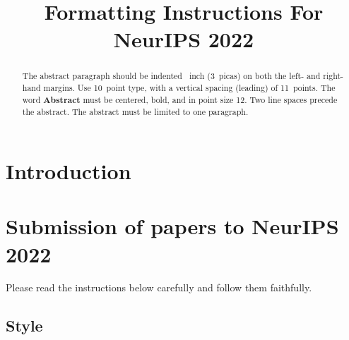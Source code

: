 \documentclass{article}
\title{Formatting Instructions For NeurIPS 2022}
\begin{document}
\maketitle


\begin{abstract}
  The abstract paragraph should be indented ~inch (3~picas) on
  both the left- and right-hand margins. Use 10~point type, with a vertical
  spacing (leading) of 11~points.  The word \textbf{Abstract} must be centered,
  bold, and in point size 12. Two line spaces precede the abstract. The abstract
  must be limited to one paragraph.
\end{abstract}

\section{Introduction}

\section{Submission of papers to NeurIPS 2022}


Please read the instructions below carefully and follow them faithfully.


\subsection{Style}
\end{document}
